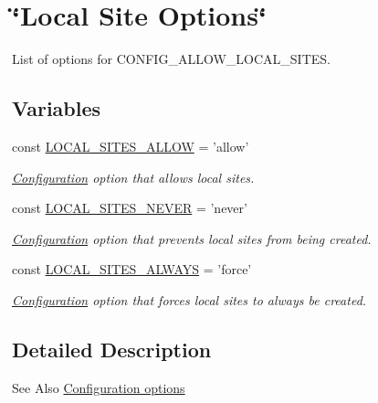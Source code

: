 \hypertarget{group__local__site__options}{\section{\char`\"{}\-Local Site Options\char`\"{}}
\label{group__local__site__options}
}


List of options for C\-O\-N\-F\-I\-G\-\_\-\-A\-L\-L\-O\-W\-\_\-\-L\-O\-C\-A\-L\-\_\-\-S\-I\-T\-E\-S.  


\subsection*{Variables}
\begin{DoxyCompactItemize}
\item 
const \hyperlink{group__local__site__options_ga36d64963016f0065c0b9b5eddd333d8f}{L\-O\-C\-A\-L\-\_\-\-S\-I\-T\-E\-S\-\_\-\-A\-L\-L\-O\-W} = 'allow'
\begin{DoxyCompactList}\small\item\em \hyperlink{classConfiguration}{Configuration} option that allows local sites. \end{DoxyCompactList}\item 
const \hyperlink{group__local__site__options_ga367f4249eff6d5bff038aec1cfdb16bc}{L\-O\-C\-A\-L\-\_\-\-S\-I\-T\-E\-S\-\_\-\-N\-E\-V\-E\-R} = 'never'
\begin{DoxyCompactList}\small\item\em \hyperlink{classConfiguration}{Configuration} option that prevents local sites from being created. \end{DoxyCompactList}\item 
const \hyperlink{group__local__site__options_ga0b19cf86b69f53eb2decd943ebe31d19}{L\-O\-C\-A\-L\-\_\-\-S\-I\-T\-E\-S\-\_\-\-A\-L\-W\-A\-Y\-S} = 'force'
\begin{DoxyCompactList}\small\item\em \hyperlink{classConfiguration}{Configuration} option that forces local sites to always be created. \end{DoxyCompactList}\end{DoxyCompactItemize}


\subsection{Detailed Description}
\begin{DoxySeeAlso}{See Also}
\hyperlink{group__config}{Configuration options} 
\end{DoxySeeAlso}


